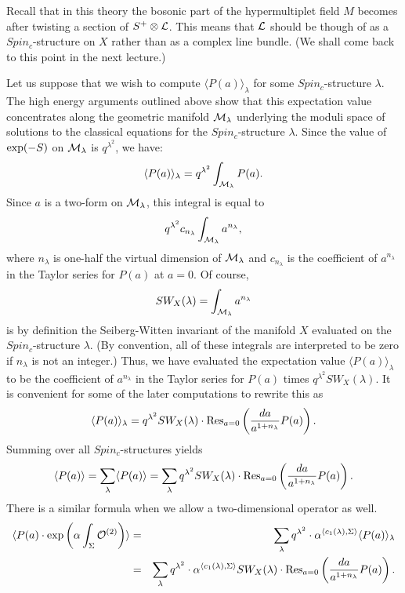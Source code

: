 \documentclass[10pt]{article}
\begin{document}
Recall that in this theory the bosonic part of the hypermultiplet
field $M$ becomes after twisting a section of $S^+\otimes {\cal
L}$. This means that ${\cal L}$ should be though of as a
$Spin_c$-structure on $X$ rather than as a complex line bundle.  (We
shall come back to this point in the next lecture.)

Let us suppose that we wish to compute
$\langle P(a)\rangle_\lambda$
for some $Spin_c$-structure $\lambda$.
The high energy arguments outlined above show that this expectation
value concentrates along the geometric manifold ${\cal M}_\lambda$
underlying the moduli space of
solutions to the classical equations for the $Spin_c$-structure
$\lambda$.  Since the value of ${\rm exp}(-S)$ on ${\cal
M}_\lambda$ is $q^{\lambda^2}$, we have:
$$\langle P(a)\rangle_\lambda =q^{\lambda^2}\int_{{\cal M}_\lambda}
P(a).$$ 
Since $a$ is a two-form on ${\cal M}_\lambda$, this integral is equal
to
$$q^{\lambda^2}c_{n_\lambda}\int_{{\cal M}_\lambda}a^{n_\lambda},$$
where $n_\lambda$ is one-half the virtual dimension of ${\cal
M}_\lambda$ and $c_{n_\lambda}$ is the coefficient of $a^{n_\lambda}$
in the Taylor series for $P(a)$ at $a=0$. 
Of course,
$$SW_X(\lambda)=\int_{{\cal M}_\lambda}a^{n_\lambda}$$
is by definition the Seiberg-Witten invariant of the manifold
$X$ evaluated on  the $Spin_c$-structure $\lambda$.
(By convention, all of these integrals are interpreted to be zero if
$n_\lambda$ is not an integer.)
Thus, we have evaluated the expectation value $\langle
P(a)\rangle_\lambda$  to be the coefficient of $a^{n_\lambda}$ in the
Taylor series for $P(a)$ times $q^{\lambda^2}SW_X(\lambda)$.
It is convenient for some of the later computations to rewrite this as 
$$\langle P(a)\rangle_\lambda =q^{\lambda^2}SW_X(\lambda)
\cdot{\rm Res}_{a=0}\left(\frac{da}{a^{1+n_\lambda}}P(a)\right). $$
Summing over all $Spin_c$-structures yields
$$\langle P(a)\rangle =\sum_\lambda\langle P(a)\rangle =
\sum_\lambda q^{\lambda^2}SW_X(\lambda)\cdot {\rm
Res}_{a=0}\left( \frac{da}{a^{1+n_\lambda}}P(a)\right).$$
There is a similar formula when we allow a two-dimensional operator as
well.
\begin{eqnarray*}
\langle P(a)\cdot{\rm exp}\left(\alpha\int_\Sigma{\cal
O}^{(2)}\right)\rangle & = & \sum_\lambda q^{\lambda^ {2}}\cdot
\alpha^{\langle 
c_1(\lambda),\Sigma\rangle} \langle
P(a)\rangle_\lambda \\
&  = & \sum_\lambda q^{\lambda^2}\cdot \alpha^{\langle
c_1(\lambda),\Sigma\rangle}SW_X(\lambda)\cdot{\rm
Res}_{a=0} \left(\frac{da}{a^{1+n_\lambda}}P(a)\right).
\end{eqnarray*}
\end{document}
